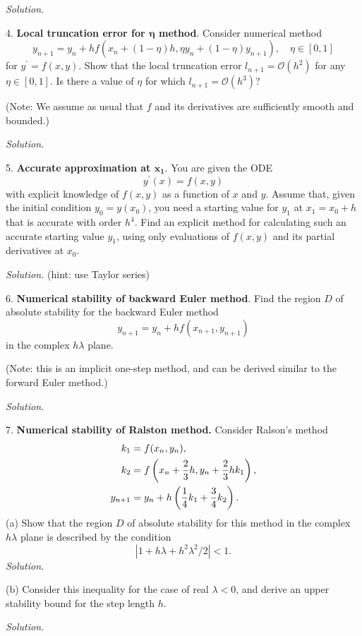\documentclass{article}
\newcommand{\Oh}{\mathcal{O}}
\begin{document}
\textit{Solution.}

\newpage

4. \textbf{Local truncation error for $\boldsymbol\eta$ method}.
Consider numerical method
%
\begin{equation*}
    y_{n + 1} = y_n + h f(x_n + (1 - \eta) h, \eta y_n + (1 - \eta) y_{n + 1}), \quad \eta \in [0, 1]
\end{equation*}
%
for $y^\prime = f(x, y)$. Show that the local truncation error $l_{n + 1} = \Oh(h^2)$ for any $\eta \in [0, 1]$. Is there
a value of $\eta$ for which $l_{n + 1} = \Oh(h^3)$?

(Note: We assume as usual that $f$ and its derivatives are sufficiently smooth and bounded.)

\textit{Solution.}

\newpage

5. \textbf{Accurate approximation at $\boldsymbol{x_1}$}.
You are given the ODE
%
\begin{equation*}
    y^\prime(x) = f(x, y)
\end{equation*}
%
with explicit knowledge of $f(x, y)$ as a function of $x$ and $y$. Assume that, given the initial condition $y_0 = y(x_0)$,
you need a starting value for $y_1$ at $x_1 = x_0 + h$ that is accurate with order $h^4$. Find an explicit method for calculating
such an accurate starting value $y_1$, using only evaluations of $f(x, y)$ and its partial derivatives at $x_0$.

\textit{Solution.}
(hint: use Taylor series)

\newpage

6. \textbf{Numerical stability of backward Euler method}.
Find the region $D$ of absolute stability for the backward Euler method
%
\begin{equation*}
    y_{n + 1} = y_n + h f(x_{n + 1}, y_{n + 1})
\end{equation*}
%
in the complex $h \lambda$ plane.

(Note: this is an implicit one-step method, and can be derived similar to the forward Euler method.)

\textit{Solution.}

\newpage

7. \textbf{Numerical stability of Ralston method.}
Consider Ralson's method
%
\begin{align*}
    k_1 &= f(x_n, y_n), \\
    k_2 &= f\del{x_n + \frac{2}{3} h, y_n + \frac{2}{3}h k_1}, \\
    y_{n + 1} &= y_n + h \del{\frac{1}{4} k_1 + \frac{3}{4} k_2}.
\end{align*}
%
(a) Show that the region $D$ of absolute stability for this method in the complex $h \lambda$ plane is
described by the condition
%
\begin{equation*}
    |1 + h \lambda + h^2 \lambda^2 / 2| < 1.
\end{equation*}
%
\textit{Solution.}

\vspace{5mm}

(b) Consider this inequality for the case of real $\lambda < 0$, and derive an upper stability bound for the step length $h$.

\textit{Solution.}
\end{document}
